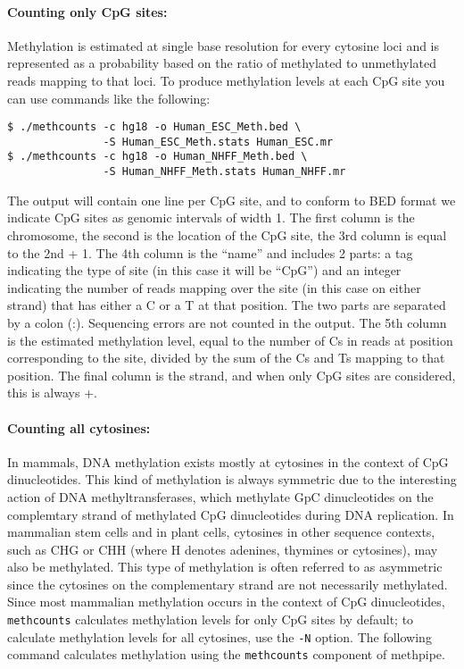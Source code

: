 \documentclass[10pt]{article}
\newcommand{\prog}[1]{\texttt{#1}}
\newcommand{\op}[1]{\texttt{#1}}
\begin{document}
\paragraph{Counting only CpG sites:}
Methylation is estimated at single base resolution for every cytosine
loci and is represented as a probability based on the ratio of
methylated to unmethylated reads mapping to that loci. To produce
methylation levels at each CpG site you can use commands like the
following:
\begin{verbatim}
$ ./methcounts -c hg18 -o Human_ESC_Meth.bed \
               -S Human_ESC_Meth.stats Human_ESC.mr
$ ./methcounts -c hg18 -o Human_NHFF_Meth.bed \
               -S Human_NHFF_Meth.stats Human_NHFF.mr
\end{verbatim}
The output will contain one line per CpG site, and to conform to BED
format we indicate CpG sites as genomic intervals of width 1. The
first column is the chromosome, the second is the location of the CpG
site, the 3rd column is equal to the 2nd + 1. The 4th column is the
``name'' and includes 2 parts: a tag indicating the type of site (in
this case it will be ``CpG'') and an integer indicating the number of
reads mapping over the site (in this case on either strand) that has
either a C or a T at that position. The two parts are separated by a
colon (:). Sequencing errors are not counted in the output. The 5th
column is the estimated methylation level, equal to the number of Cs
in reads at position corresponding to the site, divided by the sum of
the Cs and Ts mapping to that position. The final column is the
strand, and when only CpG sites are considered, this is always +.

\paragraph{Counting all cytosines:}
In mammals, DNA methylation exists mostly at cytosines in the context
of CpG dinucleotides. This kind of methylation is always symmetric due
to the interesting action of DNA methyltransferases, which methylate
GpC dinucleotides on the complemtary strand of methylated CpG
dinucleotides during DNA replication.  In mammalian stem cells and in
plant cells, cytosines in other sequence contexts, such as CHG or CHH
(where H denotes adenines, thymines or cytosines), may also be
methylated. This type of methylation is often referred to as
asymmetric since the cytosines on the complementary strand are not
necessarily methylated. Since most mammalian methylation occurs in the
context of CpG dinucleotides, \prog{methcounts} calculates methylation
levels for only CpG sites by default; to calculate methylation levels
for all cytosines, use the \op{-N} option. The following command
calculates methylation using the \prog{methcounts} component of
methpipe.
\end{document}
